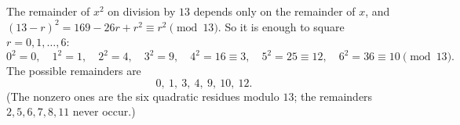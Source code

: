 The remainder of $x^2$ on division by $13$ depends only on the remainder of $x$, and $(13-r)^2=169-26r+r^2\equiv r^2\pmod{13}$. So it is enough to square $r=0,1,\dots,6$:
\[0^2=0,\quad1^2=1,\quad2^2=4,\quad3^2=9,\quad4^2=16\equiv3,\quad5^2=25\equiv12,\quad6^2=36\equiv10\pmod{13}.\]
The possible remainders are
\[\boxed{0,\ 1,\ 3,\ 4,\ 9,\ 10,\ 12}.\]
(The nonzero ones are the six quadratic residues modulo $13$; the remainders $2,5,6,7,8,11$ never occur.)
